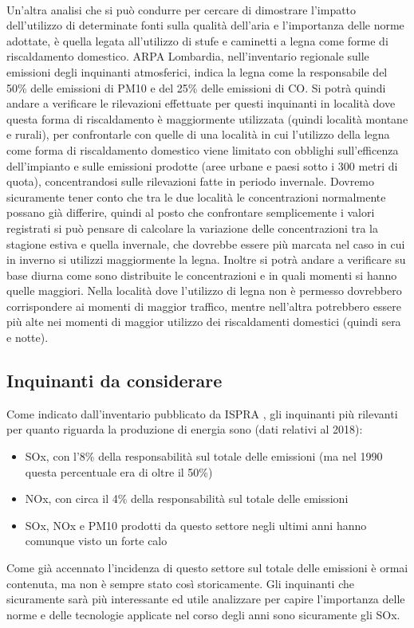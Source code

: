 \documentclass{article}
\begin{document}
\\Un'altra analisi che si può condurre per cercare di dimostrare l'impatto dell'utilizzo di determinate fonti sulla qualità dell'aria e l'importanza delle norme adottate, è quella legata all'utilizzo di stufe e caminetti a legna come forme di riscaldamento domestico. ARPA Lombardia, nell'inventario regionale sulle emissioni degli inquinanti atmosferici\cite{inemar2017}, indica la legna come la responsabile del 50\% delle emissioni di PM10 e del 25\% delle emissioni di CO. Si potrà quindi andare a verificare le rilevazioni effettuate per questi inquinanti in località dove questa forma di riscaldamento è maggiormente utilizzata (quindi località montane e rurali), per confrontarle con quelle di una località in cui l'utilizzo della legna come forma di riscaldamento domestico viene limitato con obblighi sull'efficenza dell'impianto e sulle emissioni prodotte (aree urbane e paesi sotto i 300 metri di quota), concentrandosi sulle rilevazioni fatte in periodo invernale. Dovremo sicuramente tener conto che tra le due località le concentrazioni normalmente possano già differire, quindi al posto che confrontare semplicemente i valori registrati si può pensare di calcolare la variazione delle concentrazioni tra la stagione estiva e quella invernale, che dovrebbe essere più marcata nel caso in cui in inverno si utilizzi maggiormente la legna. Inoltre si potrà andare a verificare su base diurna come sono distribuite le concentrazioni e in quali momenti si hanno quelle maggiori. Nella località dove l'utilizzo di legna non è permesso dovrebbero corrispondere ai momenti di maggior traffico, mentre nell'altra potrebbero essere più alte nei momenti di maggior utilizzo dei riscaldamenti domestici (quindi sera e notte).

\subsection{Inquinanti da considerare}
Come indicato dall'inventario pubblicato da ISPRA \cite{iir2020}, gli inquinanti più rilevanti per quanto riguarda la produzione di energia sono (dati relativi al 2018): 
\begin{itemize}
	\item SOx, con l'8\% della responsabilità sul totale delle emissioni (ma nel 1990 questa percentuale era di oltre il 50\%)
	\item NOx, con circa il 4\% della responsabilità sul totale delle emissioni
	\item SOx, NOx e PM10 prodotti da questo settore negli ultimi anni hanno comunque visto un forte calo
\end{itemize}
Come già accennato l'incidenza di questo settore sul totale delle emissioni è ormai contenuta, ma non è sempre stato così storicamente. Gli inquinanti che sicuramente sarà più interessante ed utile analizzare per capire l'importanza delle norme e delle tecnologie applicate nel corso degli anni sono sicuramente gli SOx.
\newpage
\end{document}

